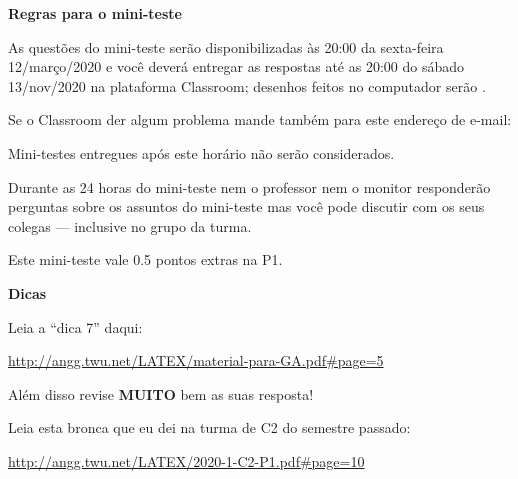 \documentclass[oneside,12pt]{article}
\begin{document}
\newpage

%

{\bf Regras para o mini-teste}


As questões do mini-teste serão disponibilizadas às 20:00 da
sexta-feira 12/março/2020 e você deverá entregar as respostas
 até as 20:00 do sábado 13/nov/2020 na
plataforma Classroom; desenhos feitos no computador serão
.

Se o Classroom der algum problema mande também para este endereço de
e-mail:

\ssk


\ssk

Mini-testes entregues após este horário não serão considerados.

Durante as 24 horas do mini-teste nem o professor nem o monitor
responderão perguntas sobre os assuntos do mini-teste mas você pode
discutir com os seus colegas --- inclusive no grupo da turma.

Este mini-teste vale 0.5 pontos extras na P1.


\newpage


{\bf Dicas}

\ssk

Leia a ``dica 7'' daqui:

\ssk

\url{http://angg.twu.net/LATEX/material-para-GA.pdf\#page=5}

\bsk

Além disso revise {\bf MUITO} bem as suas resposta!

Leia esta bronca que eu dei na turma de C2 do semestre passado:

\ssk

\url{http://angg.twu.net/LATEX/2020-1-C2-P1.pdf\#page=10}

\newpage
\end{document}
